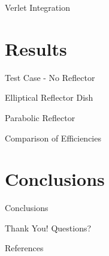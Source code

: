 \documentclass{beamer}
\begin{document}
\begin{frame}{Verlet Integration}
    
\end{frame}

\section{Results}

\begin{frame}{Test Case - No Reflector}
    
\end{frame}

\begin{frame}{Elliptical Reflector Dish}
    
\end{frame}

\begin{frame}{Parabolic Reflector}
    
\end{frame}

\begin{frame}{Comparison of Efficiencies}
    
\end{frame}

\section{Conclusions}


\begin{frame}{Conclusions}
  
\end{frame}

\begin{frame}{Thank You!}
    Questions?
\end{frame}

\begin{frame}{References}
  
  
\end{frame}
\end{document}
